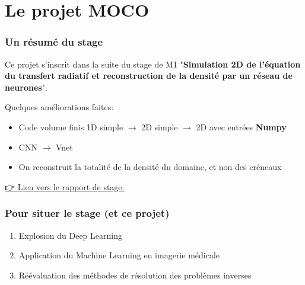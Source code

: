 

\section{Le projet MOCO}


\begin{frame}
    \frametitle{Un résumé du stage}

Ce projet s'inscrit dans la suite du stage de M1 "\textbf{Simulation 2D de l’équation du transfert radiatif et reconstruction de la densité par un réseau de neurones}". 

\pause
\vspace{0.5cm}
Quelques améliorations faites:

    \begin{itemize}
        \item Code volume finis 1D simple $\rightarrow$ 2D simple $\rightarrow$ 2D avec entrées \textbf{Numpy} \pause
        \item CNN $\rightarrow$ Vnet  \pause
        \item On reconstruit la totalité de la densité du domaine, et non des créneaux
    \end{itemize}

\pause
\vspace{0.5cm}

\href{https://github.com/desmond-rn/projet-inverse-2d/blob/master/Rapport.pdf}{👉 \Large \alert{Lien vers le rapport de stage}.} 

\end{frame}


\begin{frame}
    \frametitle{Pour situer le stage (et ce projet)}
  
    \begin{enumerate}[<+>]
      \item Explosion du Deep Learning %
      \item Application du Machine Learning en imagerie médicale %
      \item Réévaluation des méthodes de résolution des problèmes inverses %
    \end{enumerate}
    
  \end{frame}

